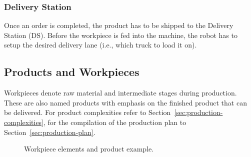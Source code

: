\documentclass[12pt,twoside]{article}
\newcommand{\refsec}[1]{Section~\ref{#1}}
\begin{document}
\subsubsection{Delivery Station} 
\label{sec:delivery-station}
Once an order is completed, the product has to be shipped to the
Delivery Station (DS). Before the workpiece is fed into the machine,
the robot has to setup the desired delivery lane (i.e., which truck to
load it on).

\subsection{Products and Workpieces}
\label{sec:products}
Workpieces denote raw material and intermediate stages during
production. These are also named products with emphasis on the
finished product that can be delivered. For product complexities refer
to \refsec{sec:production-complexities}, for the compilation of the
production plan to \refsec{sec:production-plan}.

\begin{figure}[h]
  \centering
  \quad
  \quad
  \caption{Workpiece elements and product example.}
  \label{fig:workpieces}
\end{figure}
\end{document}

